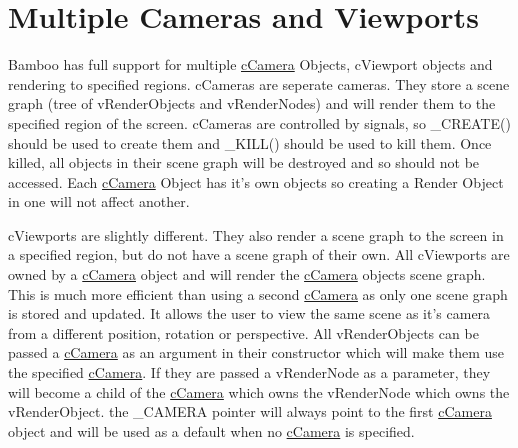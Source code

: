  \hypertarget{_using_engine_page_MultipleCamerasViewports}{}\section{Multiple Cameras and Viewports}\label{_using_engine_page_MultipleCamerasViewports}
Bamboo has full support for multiple \hyperlink{classc_camera}{cCamera} Objects, cViewport objects and rendering to specified regions. cCameras are seperate cameras. They store a scene graph (tree of vRenderObjects and vRenderNodes) and will render them to the specified region of the screen. cCameras are controlled by signals, so \_\-CREATE() should be used to create them and \_\-KILL() should be used to kill them. Once killed, all objects in their scene graph will be destroyed and so should not be accessed. Each \hyperlink{classc_camera}{cCamera} Object has it's own objects so creating a Render Object in one will not affect another. \par
 cViewports are slightly different. They also render a scene graph to the screen in a specified region, but do not have a scene graph of their own. All cViewports are owned by a \hyperlink{classc_camera}{cCamera} object and will render the \hyperlink{classc_camera}{cCamera} objects scene graph. This is much more efficient than using a second \hyperlink{classc_camera}{cCamera} as only one scene graph is stored and updated. It allows the user to view the same scene as it's camera from a different position, rotation or perspective. All vRenderObjects can be passed a \hyperlink{classc_camera}{cCamera} as an argument in their constructor which will make them use the specified \hyperlink{classc_camera}{cCamera}. If they are passed a vRenderNode as a parameter, they will become a child of the \hyperlink{classc_camera}{cCamera} which owns the vRenderNode which owns the vRenderObject. the \_\-CAMERA pointer will always point to the first \hyperlink{classc_camera}{cCamera} object and will be used as a default when no \hyperlink{classc_camera}{cCamera} is specified. 
